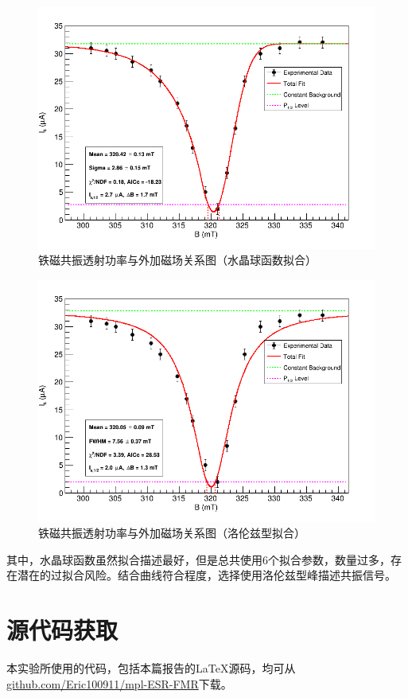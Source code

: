 \documentclass{thuemp}
\begin{document}
    \begin{figure}[H]
        \centering
        \includegraphics[width=0.9\linewidth]{../Data/FMR_ConstantBg_CrystalBallPeak.png}
        \caption{铁磁共振透射功率与外加磁场关系图（水晶球函数拟合）} \label{fig:FMR_CrystalBall}
    \end{figure}

    \begin{figure}[H]
        \centering
        \includegraphics[width=0.9\linewidth]{../Data/FMR_ConstantBg_LorentzPeak.png}
        \caption{铁磁共振透射功率与外加磁场关系图（洛伦兹型拟合）} \label{fig:FMR_Lorentz}
    \end{figure}
    
    其中，水晶球函数虽然拟合描述最好，但是总共使用6个拟合参数，数量过多，存在潜在的过拟合风险。结合曲线符合程度，选择使用洛伦兹型峰描述共振信号。
    
    
    
    \section{源代码获取}
    
    本实验所使用的代码，包括本篇报告的\LaTeX 源码，均可从\url{github.com/Eric100911/mpl-ESR-FMR}下载。
    
    
\end{document}
